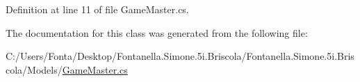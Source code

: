 Definition at line 11 of file Game\+Master.\+cs.



The documentation for this class was generated from the following file\+:\begin{DoxyCompactItemize}
\item 
C\+:/\+Users/\+Fonta/\+Desktop/\+Fontanella.\+Simone.\+5i.\+Briscola/\+Fontanella.\+Simone.\+5i.\+Briscola/\+Models/\hyperlink{_game_master_8cs}{Game\+Master.\+cs}\end{DoxyCompactItemize}
